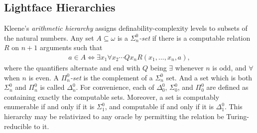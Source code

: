 \subsection{Lightface Hierarchies}

Kleene's \textit{arithmetic hierarchy} assigns definability-complexity levels to subsets of the natural numbers. Any set $A \subseteq \omega$ is a \textit{$\Sigma^0_n$-set} if there is a computable relation $R$ on $n + 1$ arguments such that 
\begin{align*}
    a \in A \iff \exists x_1 \forall x_2 \cdots Qx_n R(x_1, ..., x_n, a),
\end{align*}
where the quantifiers alternate and end with $Q$ being $\exists$ whenever $n$ is odd, and $\forall$ when $n$ is even. A \textit{$\Pi^0_n$-set} is the complement of a $\Sigma^0_n$ set. And a set which is both $\Sigma^0_n$ and $\Pi^0_n$ is called $\Delta^0_n$. For convenience, each of $\Delta^0_0$, $\Sigma^0_0$, and $\Pi^0_0$ are defined as containing exactly the computable sets. Moreover, a set is computably enumerable if and only if it is $\Sigma^0_1$, and computable if and only if it is $\Delta^0_1$. This hierarchy may be relativized to any oracle by permitting the relation be Turing-reducible to it. 

